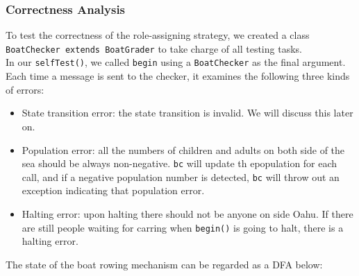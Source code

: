 \documentclass{article}
\begin{document}
\begin{spacing}{1.1}
\subsubsection{Correctness Analysis}
To test the correctness of the role-assigning strategy, we created a class \texttt{BoatChecker extends BoatGrader} to take charge of all testing tasks.\\
In our \texttt{selfTest()}, we called \texttt{begin} using a \texttt{BoatChecker} as the final argument. Each time a message is sent to the checker, it examines the following three kinds of errors:\\
\begin{itemize}
  \item State transition error: the state transition is invalid. We will discuss this later on.
  \item Population error: all the numbers of children and adults on both side of the sea should be always non-negative. \texttt{bc} will update th epopulation for each call, and if a negative population number is detected, \texttt{bc} will throw out an exception indicating that population error.
  \item Halting error: upon halting there should not be anyone on side Oahu. If there are still people waiting for carring when \texttt{begin()} is going to halt, there is a halting error.
\end{itemize}
The state of the boat rowing mechanism can be regarded as a DFA below:\\
\begin{center}
\end{center}
\end{spacing}
\end{document}
